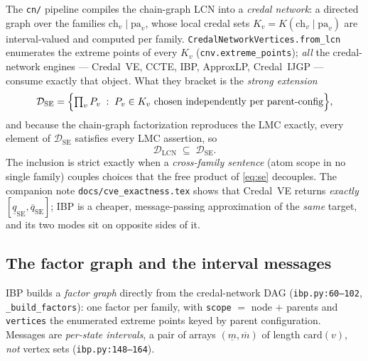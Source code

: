 \documentclass[11pt]{article}
\newcommand{\lo}{\underline}
\newcommand{\hi}{\overline}
\newcommand{\DSE}{\mathcal{D}_{\mathrm{SE}}}
\newcommand{\DLCN}{\mathcal{D}_{\mathrm{LCN}}}
\begin{document}
The \texttt{cn/} pipeline compiles the chain-graph LCN into a \emph{credal network}: a directed
graph over the families $\mathrm{ch}_v\mid\mathrm{pa}_v$, whose local credal sets
$K_v=K(\mathrm{ch}_v\mid\mathrm{pa}_v)$ are interval-valued and computed per family.
\texttt{CredalNetworkVertices.from\_lcn} enumerates the extreme points of every $K_v$
(\texttt{cnv.extreme\_points}); \emph{all} the credal-network engines --- Credal~VE, CCTE, IBP,
ApproxLP, Credal~IJGP --- consume exactly that object. What they bracket is the \emph{strong
extension}
\begin{equation}\label{eq:se}
  \DSE=\Bigl\{\textstyle\prod_v P_v \;:\; P_v\in K_v \text{ chosen independently per parent-config}\Bigr\},
\end{equation}
and because the chain-graph factorization reproduces the LMC exactly, every element of $\DSE$
satisfies every LMC assertion, so
\begin{equation}\label{eq:incl}
  \DLCN\;\subseteq\;\DSE .
\end{equation}
The inclusion is strict exactly when a \emph{cross-family sentence} (atom scope in no single family)
couples choices that the free product of \eqref{eq:se} decouples. The companion note
\texttt{docs/cve\_exactness.tex} shows that Credal~VE returns \emph{exactly} $[\lo
q_{\mathrm{SE}},\hi q_{\mathrm{SE}}]$; IBP is a cheaper, message-passing approximation of the
\emph{same} target, and its two modes sit on opposite sides of it.

\subsection{The factor graph and the interval messages}\label{sec:messages}
IBP builds a \emph{factor graph} directly from the credal-network DAG (\texttt{ibp.py:60--102},
\texttt{\_build\_factors}): one factor per family, with \texttt{scope} $=$ node $+$ parents and
\texttt{vertices} the enumerated extreme points keyed by parent configuration. Messages are
\emph{per-state intervals}, a pair of arrays $(\lo m,\hi m)$ of length $\mathrm{card}(v)$, \emph{not}
vertex sets (\texttt{ibp.py:148--164}).
\end{document}
